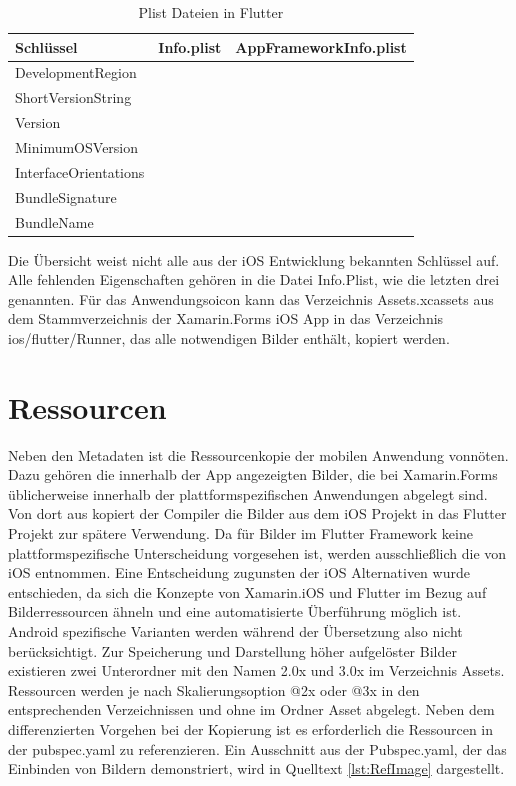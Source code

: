\begin{table}[!ht]
  \begin{tabularx}{\linewidth}{X| X| X}
  \textbf{Schlüssel}  &  \textbf{Info.plist} & \textbf{AppFrameworkInfo.plist} \\
\hline
  DevelopmentRegion  		&  					& 		\checkmark	 \\
  ShortVersionString  		&  					& 		\checkmark	 \\
  Version  							&  					& 		\checkmark	 \\
  MinimumOSVersion  		&  					& 		\checkmark	 \\
  
  InterfaceOrientations  		& \checkmark  	&		 					\\
  BundleSignature  			&  \checkmark 	& 							\\
  BundleName  					&  \checkmark 	& 		 					\\
\end{tabularx}
\caption{Plist Dateien in Flutter }
 \label{tab:InfoPlist}
\end{table}
Die Übersicht weist nicht alle aus der iOS Entwicklung bekannten Schlüssel auf.  Alle fehlenden Eigenschaften gehören in die Datei Info.Plist,  wie die letzten drei genannten. 
Für das Anwendungsoicon kann das Verzeichnis Assets.xcassets aus dem Stammverzeichnis der Xamarin.Forms iOS App in das Verzeichnis ios/flutter/Runner, das alle notwendigen Bilder enthält,  kopiert werden. 

\section{Ressourcen}

Neben den Metadaten ist die Ressourcenkopie der mobilen Anwendung vonnöten. 
Dazu gehören die innerhalb der App angezeigten Bilder, die bei Xamarin.Forms
üblicherweise innerhalb der plattformspezifischen Anwendungen abgelegt sind.
Von dort aus kopiert der Compiler die Bilder aus dem iOS Projekt in das Flutter Projekt zur spätere Verwendung.  Da für Bilder im Flutter Framework keine plattformspezifische Unterscheidung vorgesehen ist,  werden ausschließlich die von iOS entnommen. Eine Entscheidung zugunsten der iOS Alternativen wurde  entschieden,  da sich die Konzepte von Xamarin.iOS und Flutter im Bezug auf Bilderressourcen ähneln und eine automatisierte Überführung möglich ist.  Android spezifische Varianten werden während der Übersetzung also nicht berücksichtigt.   
Zur Speicherung und Darstellung höher aufgelöster Bilder existieren zwei Unterordner mit den Namen 2.0x und 3.0x im Verzeichnis Assets.  Ressourcen werden je nach Skalierungsoption @2x oder @3x in den entsprechenden Verzeichnissen und ohne im Ordner Asset abgelegt.
Neben dem differenzierten Vorgehen bei der Kopierung ist es erforderlich die Ressourcen in der pubspec.yaml zu referenzieren.  Ein Ausschnitt aus der Pubspec.yaml,  der das Einbinden von Bildern demonstriert,  wird in Quelltext  \ref{lst:RefImage} dargestellt.

